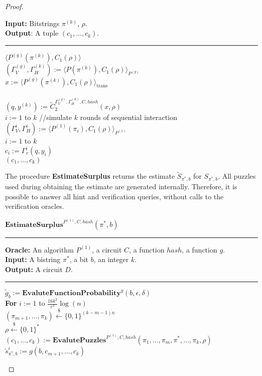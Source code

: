 \begin{proof}
\begin{codeblock}
  \textbf{Input:} Bitstrings $\pi^{(k)}$, $\rho$.\\
  \textbf{Output}: A tuple $(c_1, \dots, c_k)$.
  \medskip\hrule\medskip
  \Run $\langle P^{(g)}(\pi^{(k)}), C_1(\rho) \rangle$ \\
  \IndI $(\Gamma_V^{(g)}, \Gamma_H^{(k)}) := \langle P(\pi^{(k)}), C_1(\rho) \rangle_{P^{(g)}}$ \\
  \IndI $x := \langle P^{(g)}(\pi^{(k)}), C_1(\rho) \rangle_{\text{trans}}$ \\ \\
  $(q,y^{(k)}) := \widetilde{C}_2^{\Gamma_V^{(g)}, \Gamma_H^{(k)}, C, hash}(x, \rho)$\\
  \For $i:=1$ to $k$ \Do \IndII //simulate $k$ rounds of sequential interaction \\
  \IndI $(\Gamma_V^{i}, \Gamma_H^{i}) := \langle P^{(1)}(\pi_i), C_1(\rho) \rangle_{P^{(1)}} $\\
  \For $i:=1$ to $k$ \Do \\
  \IndI $c_i := \Gamma_v^{i}(q, y_i)$\\
  \return $(c_1, \dots, c_k)$
\end{codeblock}
%
The procedure \textbf{EstimateSurplus} returns the estimate $\widetilde{S}_{\pi^*, b}$ for $S_{\pi^*, b}$.
All puzzles used during obtaining the estimate are generated internally.
Therefore, it is possible to answer all hint and verification queries, without calls to the verification oracles.
%
\begin{codeblock}
  $\textbf{EstimateSurplus}^{P^{(1)}, C, hash}(\pi^*, b)$
  \medskip
  \hrule
  \medskip
  \textbf{Oracle:} An algorithm $P^{(1)}$, a circuit $C$, a function $hash$, a function $g$.\\
  \textbf{Input:} A bistring $\pi^*$, a bit $b$, an integer $k$.\\
  \textbf{Output:} A circuit $D$.
  \medskip\hrule\medskip
  $\widetilde{g}_b := \textbf{EvaluteFunctionProbability}^{g}(b, \epsilon, \delta)$ \\
  \textbf{For} $i:=1$ to $\frac{16k^2}{\epsilon^2}\log(n)$ \Do \\
  \IndI $(\pi_{m+1}, \dots, \pi_k) \xleftarrow{\$} \{0,1\}^{(k-m-1)n}$\\
  \IndI $\rho \xleftarrow{\$} \{0,1\}^{*}$\\
  \IndI $(c_1, \dots, c_k) := \textbf{EvalutePuzzles}^{P^{(1)}, C, hash}(\pi_1, \dots, \pi_{m}, \pi^*, \dots, \pi_k, \rho)$\\
  \IndI $\widetilde{s}_{\pi^*,b}^i := g(b, c_{m+1}, \dots, c_k)$\\

\end{codeblock}
\end{proof}
